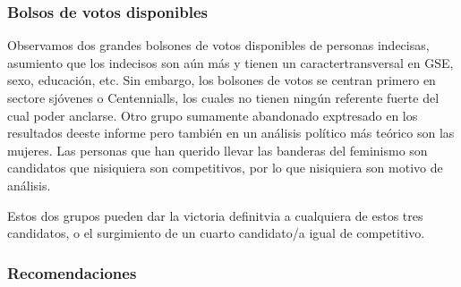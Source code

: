 \documentclass[
]{article}
\begin{document}
\hypertarget{bolsos-de-votos-disponibles}{%
\subsubsection{Bolsos de votos
disponibles}\label{bolsos-de-votos-disponibles}}

Observamos dos grandes bolsones de votos disponibles de personas
indecisas, asumiento que los indecisos son aún más y tienen un
caractertransversal en GSE, sexo, educación, etc. Sin embargo, los
bolsones de votos se centran primero en sectore sjóvenes o Centennialls,
los cuales no tienen ningún referente fuerte del cual poder anclarse.
Otro grupo sumamente abandonado exptresado en los resultados deeste
informe pero también en un análisis político más teórico son las
mujeres. Las personas que han querido llevar las banderas del feminismo
son candidatos que nisiquiera son competitivos, por lo que nisiquiera
son motivo de análisis.

Estos dos grupos pueden dar la victoria definitvia a cualquiera de estos
tres candidatos, o el surgimiento de un cuarto candidato/a igual de
competitivo.

\hypertarget{recomendaciones}{%
\subsubsection{Recomendaciones}\label{recomendaciones}}
\end{document}
